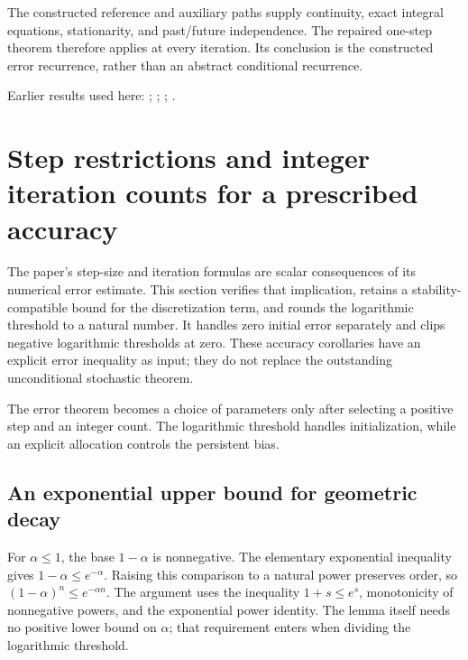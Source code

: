 \documentclass[11pt,a4paper]{report}
\begin{document}
The constructed reference and auxiliary paths supply continuity, exact integral equations, stationarity, and past/\allowbreak{}future independence. The repaired one-step theorem therefore applies at every iteration. Its conclusion is the constructed error recurrence, rather than an abstract conditional recurrence.



Earlier results used here: \cite[Section~3.13.2]{LangevinLean2026ULASC}; \cite[Section~3.17.1]{LangevinLean2026ULASC}; \cite[Section~3.17.2]{LangevinLean2026ULASC}; \cite[Section~3.26.3]{LangevinLean2026ULASC}.
\section{\texorpdfstring{Step restrictions and integer iteration counts for a prescribed accuracy}{Step restrictions and integer iteration counts for a prescribed accuracy}}
\label{proof-module-KineticLangevin-Complexity-lean}


The paper's step-size and iteration formulas are scalar consequences of its numerical error estimate. This section verifies that implication, retains a stability-compatible bound for the discretization term, and rounds the logarithmic threshold to a natural number. It handles zero initial error separately and clips negative logarithmic thresholds at zero. These accuracy corollaries have an explicit error inequality as input; they do not replace the outstanding unconditional stochastic theorem.



The error theorem becomes a choice of parameters only after selecting a positive step and an integer count. The logarithmic threshold handles initialization, while an explicit allocation controls the persistent bias.

\subsection{\texorpdfstring{An exponential upper bound for geometric decay}{An exponential upper bound for geometric decay}}
\label{report-step-KineticLangevin-Complexity-lean-1}


For \(\alpha\le1\), the base \(1-\alpha\) is nonnegative. The elementary exponential inequality gives \(1-\alpha\le e^{-\alpha}\). Raising this comparison to a natural power preserves order, so \((1-\alpha)^n\le e^{-\alpha n}\). The argument uses the inequality \(1+s\le e^s\), monotonicity of nonnegative powers, and the exponential power identity. The lemma itself needs no positive lower bound on \(\alpha\); that requirement enters when dividing the logarithmic threshold.
\end{document}

